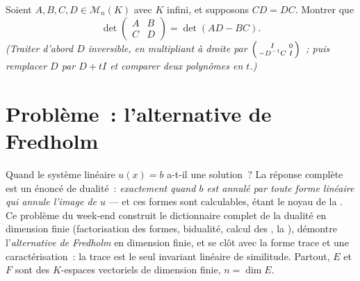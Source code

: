 \begin{exercise}[$\star\star\star$]\label{exo:b2:linalg:12}
Soient $A, B, C, D \in \mathcal{M}_n(K)$ avec $K$ infini, et
supposons $CD = DC$. Montrer que
\[
\det\begin{pmatrix} A & B\\ C & D\end{pmatrix}
= \det(AD - BC).
\]
\emph{(Traiter d'abord $D$ inversible, en multipliant à droite par
$\begin{psmallmatrix} I & 0\\ -D^{-1}C & I\end{psmallmatrix}$~;
puis remplacer $D$ par $D + tI$ et comparer deux polynômes en $t$.)}
\end{exercise}

\section{Problème~: l'alternative de Fredholm}

Quand le système linéaire $u(x) = b$ a-t-il une solution~? La réponse
complète est un énoncé de dualité~: \emph{exactement quand $b$ est
annulé par toute forme linéaire qui annule l'image de
$u$} --- et ces formes sont calculables, étant le noyau de la
. Ce problème du week-end construit le dictionnaire complet
de la dualité en dimension finie (factorisation des formes, bidualité,
calcul des , la ), démontre l'\emph{alternative de
Fredholm} en dimension finie, et se clôt avec la forme trace et une
caractérisation~: la trace est le seul invariant linéaire de
similitude. Partout, $E$ et $F$ sont des $K$-espaces vectoriels de
dimension finie, $n = \dim E$.

